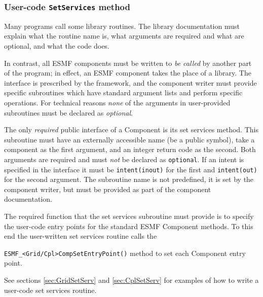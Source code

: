 %

\subsubsection{User-code {\tt SetServices} method}

Many programs call some library routines.  The library
documentation must explain what the routine name is, what arguments 
are required and what are optional, and what the code does.  

In contrast, all ESMF components must be written to {\it be called}
by another part of the program; in effect, an ESMF component takes the 
place of a library.  The interface is prescribed by the framework,
and the component writer must provide specific subroutines which 
have standard argument lists and perform specific operations.
For technical reasons {\em none} of the arguments in user-provided subroutines
must be declared as {\em optional}.

The only {\em required} public interface of a Component is its
set services method.  This subroutine must have an
externally accessible name (be a public symbol), take a component
as the first argument, and an integer return code as the second. 
Both arguments are required and must {\em not} be declared as 
{\tt optional}. If an intent is specified in the interface it must be 
{\tt intent(inout)} for the first and {\tt intent(out)} for the 
second argument. The subroutine name is not predefined, it is set by the
component writer, but must be provided as part of the component 
documentation.

The required function that the set services subroutine must provide is to
specify the user-code entry points for the standard ESMF Component methods. To
this end the user-written set services routine calls the

{\tt ESMF\_<Grid/Cpl>CompSetEntryPoint()} method to set each 
Component entry point.

See sections \ref{sec:GridSetServ} and \ref{sec:CplSetServ} for examples of
how to write a user-code set services routine.

